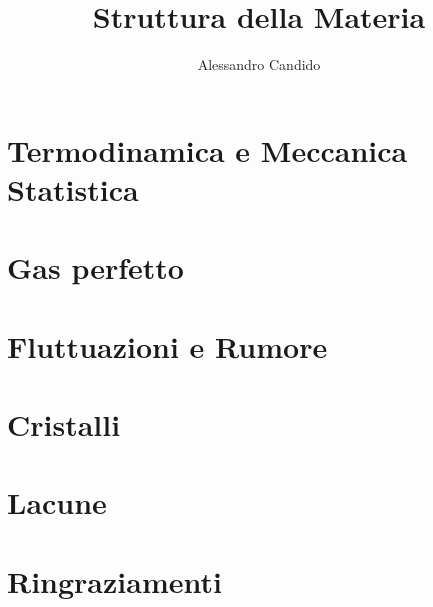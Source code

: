 \documentclass[10pt,%
			a4paper,%
			cleardoublepage=empty,%
			]{book}
\title{Struttura della Materia}
\author{Alessandro Candido%
}
\begin{document}
	
\frontmatter


\clearpage


\mainmatter
\chapter{Termodinamica e Meccanica Statistica}
\label{chap:termstat}



\chapter{Gas perfetto}
\label{chap:gas}



\chapter{Fluttuazioni e Rumore}
\label{chap:fluct}



\chapter{Cristalli}
\label{chap:crystals}



\appendix

\chapter{Lacune}



\chapter{Ringraziamenti}




\end{document}
